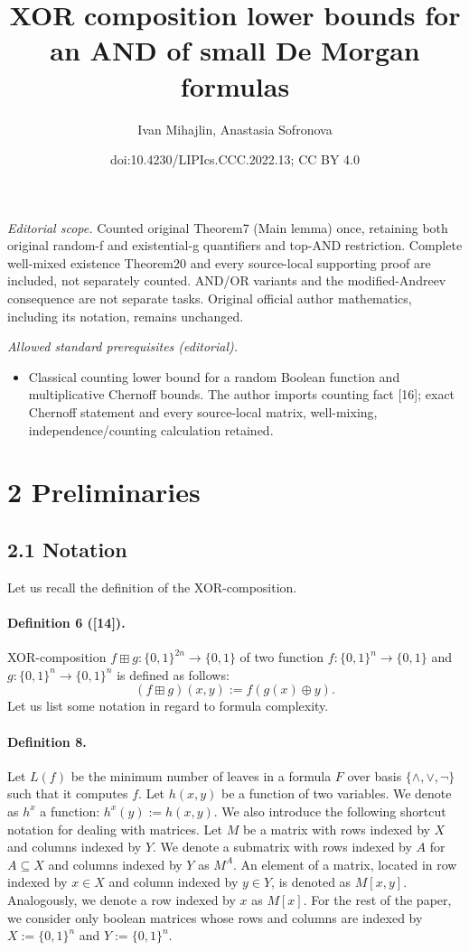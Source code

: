 \documentclass[10pt,a4paper]{article}
\title{XOR composition lower bounds for an AND of small De Morgan formulas}
\author{Ivan Mihajlin, Anastasia Sofronova}
\date{doi:10.4230/LIPIcs.CCC.2022.13; CC BY 4.0}
\begin{document}
\maketitle
\noindent\textit{Editorial scope.} Counted original Theorem7 (Main lemma) once, retaining both original random-f and existential-g quantifiers and top-AND restriction. Complete well-mixed existence Theorem20 and every source-local supporting proof are included, not separately counted. AND/OR variants and the modified-Andreev consequence are not separate tasks. Original official author mathematics, including its notation, remains unchanged.\par\medskip
\noindent\textit{Allowed standard prerequisites (editorial).}\begin{itemize}
\item Classical counting lower bound for a random Boolean function and multiplicative Chernoff bounds. The author imports counting fact [16]; exact Chernoff statement and every source-local matrix, well-mixing, independence/counting calculation retained.
\end{itemize}\medskip
\section*{2 Preliminaries}
\subsection*{2.1 Notation}
Let us recall the definition of the XOR-composition.
\paragraph{Definition 6 ([14]).} XOR-composition $f\boxplus g:\{0,1\}^{2n}\to\{0,1\}$ of two function $f:\{0,1\}^n\to\{0,1\}$ and $g:\{0,1\}^n\to\{0,1\}^n$ is defined as follows:
\[(f\boxplus g)(x,y):=f(g(x)\oplus y).\]
Let us list some notation in regard to formula complexity.
\paragraph{Definition 8.} Let $L(f)$ be the minimum number of leaves in a formula $F$ over basis $\{\wedge,\vee,\neg\}$ such that it computes $f$.
Let $h(x,y)$ be a function of two variables. We denote as $h^x$ a function: $h^x(y):=h(x,y)$.
We also introduce the following shortcut notation for dealing with matrices. Let $M$ be a matrix with rows indexed by $X$ and columns indexed by $Y$. We denote a submatrix with rows indexed by $A$ for $A\subseteq X$ and columns indexed by $Y$ as $M^A$. An element of a matrix, located in row indexed by $x\in X$ and column indexed by $y\in Y$, is denoted as $M[x,y]$. Analogously, we denote a row indexed by $x$ as $M[x]$.
For the rest of the paper, we consider only boolean matrices whose rows and columns are indexed by $X:=\{0,1\}^n$ and $Y:=\{0,1\}^n$.
\end{document}
